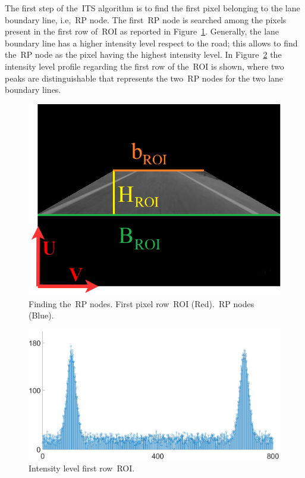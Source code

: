 The first step of the~\gls{ITS} algorithm is to find the first pixel belonging to the lane boundary line, i.e,~\gls{RP}  node. The first~\gls{RP} node is searched among the pixels present in the first row of~\gls{ROI} as reported in Figure~\ref{fig:rootpixel}. Generally, the lane boundary line has a higher intensity level respect to the road; this allows to find the~\gls{RP} node as the pixel having the highest intensity level. In Figure~\ref{fig:rootframe} the intensity level profile regarding the first row of the~\gls{ROI} is shown, where two peaks are distinguishable that represents the two~\gls{RP}  nodes for the two lane boundary lines.

\begin{figure}[ht]
	\centering
	\includegraphics[scale=0.55]{figure/Part1/Chapter4/figures/roi.png}
	\caption{Finding the~\gls{RP} nodes. First pixel row~\gls{ROI} (Red).~\gls{RP} nodes (Blue). }
	\label{fig:rootpixel}
\end{figure}

\begin{figure} [ht]
	\centering
	\includegraphics[scale=0.3]{figure/Part1/Chapter4/figures/plot.png}
	\caption{Intensity level first row~\gls{ROI}.}
	\label{fig:rootframe}
\end{figure} 



